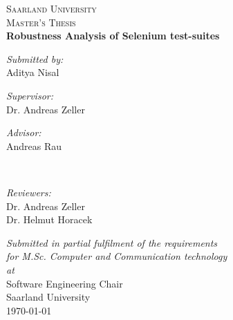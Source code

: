 \documentclass[12pt, a4paper, twoside]{Thesis} %
\begin{document}
\begin{titlepage}
\begin{center}

\textsc{\LARGE Saarland University}\\[1.5cm] %
\textsc{\Large Master's Thesis}\\[0.5cm] %

\vspace{1cm}
{\huge \bfseries Robustness Analysis of Selenium test-suites}\\[0.4cm] %
\vspace{1cm}
\begin{center}
\emph{Submitted by:}\\
{Aditya Nisal} 
\end{center}
\vspace{2cm}
\begin{minipage}{0.4\textwidth}
\begin{flushleft} 
\emph{Supervisor:}\\
{Dr. Andreas Zeller} %

\end{flushleft}
\end{minipage}
\begin{minipage}{0.4\textwidth}
\begin{flushright} 
\emph{Advisor:} \\
{Andreas Rau} %
\end{flushright}
\end{minipage}\\[1cm]


\begin{center}
\emph{Reviewers:}\\
{Dr. Andreas Zeller}\\
{Dr. Helmut Horacek}
\end{center}

\vspace{1.5cm}
\large \textit{Submitted in partial fulfilment of the requirements\\ for M.Sc. Computer and Communication technology}\\[0.3cm] %
\textit{at}\\[0.4cm]
Software Engineering Chair \\Saarland University\\[1cm] %
 
{\large \today}\\[1cm] %
 
\vfill
\end{center}

\end{titlepage}
\end{document}
